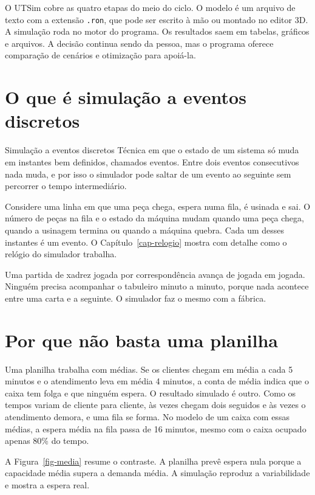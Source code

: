 O UTSim cobre as quatro etapas do meio do ciclo. O modelo é um arquivo de texto com a extensão \texttt{.ron}, que pode ser escrito à mão ou montado no editor 3D. A simulação roda no motor do programa. Os resultados saem em tabelas, gráficos e arquivos. A decisão continua sendo da pessoa, mas o programa oferece comparação de cenários e otimização para apoiá-la.

\section{O que é simulação a eventos discretos}

\begin{definicao}{Simulação a eventos discretos}
Técnica em que o estado de um sistema só muda em instantes bem definidos, chamados eventos. Entre dois eventos consecutivos nada muda, e por isso o simulador pode saltar de um evento ao seguinte sem percorrer o tempo intermediário.
\end{definicao}

Considere uma linha em que uma peça chega, espera numa fila, é usinada e sai. O número de peças na fila e o estado da máquina mudam quando uma peça chega, quando a usinagem termina ou quando a máquina quebra. Cada um desses instantes é um evento. O Capítulo~\ref{cap-relogio} mostra com detalhe como o relógio do simulador trabalha.

\begin{analogia}
Uma partida de xadrez jogada por correspondência avança de jogada em jogada. Ninguém precisa acompanhar o tabuleiro minuto a minuto, porque nada acontece entre uma carta e a seguinte. O simulador faz o mesmo com a fábrica.
\end{analogia}

\section{Por que não basta uma planilha}

Uma planilha trabalha com médias. Se os clientes chegam em média a cada 5 minutos e o atendimento leva em média 4 minutos, a conta de média indica que o caixa tem folga e que ninguém espera. O resultado simulado é outro. Como os tempos variam de cliente para cliente, às vezes chegam dois seguidos e às vezes o atendimento demora, e uma fila se forma. No modelo de um caixa com essas médias, a espera média na fila passa de 16 minutos, mesmo com o caixa ocupado apenas 80\% do tempo.

A Figura~\ref{fig-media} resume o contraste. A planilha prevê espera nula porque a capacidade média supera a demanda média. A simulação reproduz a variabilidade e mostra a espera real.

